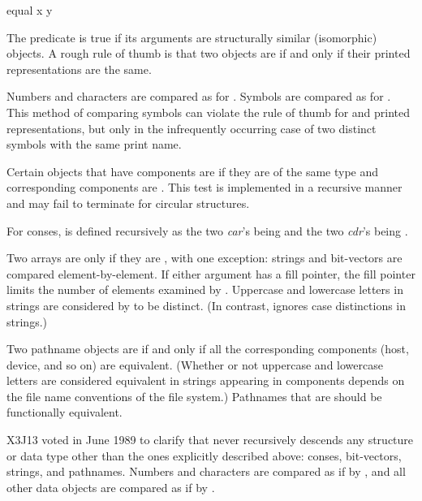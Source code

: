 \begin{defun}[Function]
equal x y

The  predicate is true if its arguments are structurally similar
(isomorphic) objects.  A rough rule of thumb is that two objects
are  if and only if their printed representations are the same.

Numbers and characters are compared as for .
Symbols are compared as for .  This method
of comparing symbols can violate the rule
of thumb for  and printed representations,
but only in the infrequently occurring case of two distinct
symbols with the same print name.

Certain objects that have components are  if they are of the same
type and corresponding components are .
This test is implemented in a recursive manner and may fail to
terminate for circular structures.

For conses,  is defined recursively as
the two \emph{car}'s being  and the two \emph{cdr}'s being
.

Two arrays are  only if they are ,
with one exception:
strings and bit-vectors are compared element-by-element.
If either argument has a fill pointer, the fill pointer limits
the number of elements examined by .
Uppercase and lowercase letters in strings are considered by
 to be distinct.  (In contrast,  ignores
case distinctions in strings.)

Two pathname objects are  if and only if
all the corresponding components
(host, device, and so on) are equivalent.  (Whether or not
uppercase and lowercase letters are considered equivalent
in strings appearing in components depends on the file
name conventions of the file system.)  Pathnames
that are  should be functionally equivalent.

\begin{new}
X3J13 voted in June 1989
to clarify that  never recursively
descends any structure or data type other than the ones explicitly
described above: conses, bit-vectors, strings, and pathnames.
Numbers and characters are compared as if by , and all other
data objects are compared as if by .
\end{new}


\end{defun}
